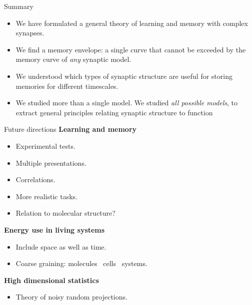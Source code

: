 \documentclass[final]{beamer}%
\begin{document}
\begin{frame}{Summary}
%
  \begin{itemize}
    \item We have formulated a general theory of learning and memory with complex synapses.
    \vp\item We find a memory envelope: a single curve that cannot be exceeded by the memory curve of \emph{any} synaptic model.
    \vp\item We understood which types of synaptic structure are useful for storing memories for different timescales.
    \vp\item We studied more than a single model. We studied \emph{all possible models}, to extract general principles relating synaptic structure to function
  \end{itemize}

%
\end{frame}


\begin{frame}{Future directions}
%
 \textbf{Learning and memory}
 \begin{itemize}
   \item Experimental tests.
   \item Multiple presentations.
   \item Correlations.
   \item More realistic tasks.
   \item Relation to molecular structure?
 \end{itemize}

 \vp\textbf{Energy use in living systems}
 \begin{itemize}
   \item Include space as well as time.
   \item Coarse graining: molecules \lto\ cells \lto\ systems.
 \end{itemize}

 \vp\textbf{High dimensional statistics}
 \begin{itemize}
   \item Theory of noisy random projections.
 \end{itemize}
%
\end{frame}
\end{document}
